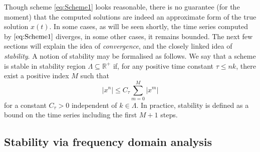 \documentclass[11pt,twoside,a4paper,english]{book}
\begin{document}
Though scheme \eqref{eq:Scheme1} looks reasonable, there is no guarantee (for the moment) that the computed solutions are indeed an approximate form of the true solution $x(t)$. In some cases, as will be seen shortly, the time series computed by $\eqref{eq:Scheme1}$ diverges, in some other cases, it remains bounded. The next few sections will explain the idea of \emph{convergence}, and the closely linked idea of \emph{stability}. A notion of stability may be formalised as follows. We say that a scheme is stable in stability region $\Lambda \subseteq \mathbb{R}^+$ if, for any positive time constant $\tau \leq n k$, there exist a positive index $M$ such that
\begin{equation}\label{eq:StabDef}
    |x^n| \leq C_\tau \sum_{m = 0}^M |x^m|
\end{equation}
for a constant $C_\tau > 0$ independent of $k \in \Lambda$. In practice, stability is defined as a bound on the time series including the first $M+1$ steps. 

\subsection{Stability via frequency domain analysis}\label{sec:FreqDomSHO}
\end{document}
